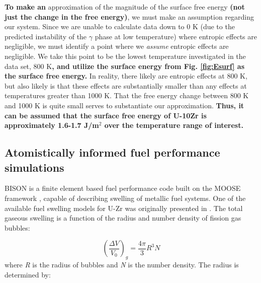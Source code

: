 \documentclass[review]{elsarticle}
\providecommand{\DIFaddtex}[1]{{\bf #1}} %
\providecommand{\DIFdeltex}[1]{} %
\providecommand{\DIFaddbegin}{\protect\color{blue}} %
\providecommand{\DIFaddend}{\protect\color{black}} %
\providecommand{\DIFdelbegin}{\protect\color{red}} %
\providecommand{\DIFdelend}{\protect\color{black}} %
\providecommand{\DIFdelFL}[1]{\DIFdel{#1}} %
\providecommand{\DIFadd}[1]{\texorpdfstring{\DIFaddtex{#1}}{#1}} %
\providecommand{\DIFdel}[1]{\texorpdfstring{\DIFdeltex{#1}}{}} %
\newcommand{\DIFscaledelfig}{0.5}
\newlength{\DIFdelgraphicswidth} %
\newlength{\DIFdelgraphicsheight} %
\newcommand{\DIFaddincludegraphics}[2][]{{\color{blue}\fbox{\DIFOincludegraphics[#1]{#2}}}} %
\newcommand{\DIFdelincludegraphics}[2][]{%
\sbox{\DIFdelgraphicsbox}{\DIFOincludegraphics[#1]{#2}}%
\settoboxwidth{\DIFdelgraphicswidth}{\DIFdelgraphicsbox} %
\settoboxtotalheight{\DIFdelgraphicsheight}{\DIFdelgraphicsbox} %
\scalebox{\DIFscaledelfig}{%
\parbox[b]{\DIFdelgraphicswidth}{\usebox{\DIFdelgraphicsbox}\\[-\baselineskip] \rule{\DIFdelgraphicswidth}{0em}}\llap{\resizebox{\DIFdelgraphicswidth}{\DIFdelgraphicsheight}{%
\setlength{\unitlength}{\DIFdelgraphicswidth}%
\begin{picture}(1,1)%
\thicklines\linethickness{2pt} %
{\color[rgb]{1,0,0}\put(0,0){\framebox(1,1){}}}%
{\color[rgb]{1,0,0}\put(0,0){\line( 1,1){1}}}%
{\color[rgb]{1,0,0}\put(0,1){\line(1,-1){1}}}%
\end{picture}%
}\hspace*{3pt}}} %
} %
\DeclareRobustCommand{\DIFaddbegin}{\DIFOaddbegin \let\includegraphics\DIFaddincludegraphics} %
\DeclareRobustCommand{\DIFaddend}{\DIFOaddend \let\includegraphics\DIFOincludegraphics} %
\DeclareRobustCommand{\DIFdelbegin}{\DIFOdelbegin \let\includegraphics\DIFdelincludegraphics} %
\DeclareRobustCommand{\DIFdelend}{\DIFOaddend \let\includegraphics\DIFOincludegraphics} %
\begin{document}
\DIFadd{To make an }\DIFaddend approximation of the magnitude of the surface free energy \DIFaddbegin \DIFadd{(not just the change in the free energy)}\DIFaddend , we must make an assumption regarding our system. Since we are unable to calculate data down to 0 K (due to the predicted instability of the $\gamma$ phase at low temperature) where entropic effects are negligible, we must identify a point where we \textit{assume} entropic effects are negligible. We take this point to be the lowest temperature investigated in the data set, 800 K\DIFdelbegin \DIFdel{. }\DIFdelend \DIFaddbegin \DIFadd{, and utilize the surface energy from Fig. \ref{fig:Esurf} as the surface free energy. }\DIFaddend In reality, there likely are entropic effects at 800 K, but also likely is that these effects are substantially smaller than any effects at temperatures greater than 1000 K. That the free energy change between 800 K and 1000 K is quite small serves to substantiate our approximation. \DIFaddbegin \DIFadd{Thus, it can be assumed that the surface free energy of U-10Zr is approximately 1.6-1.7 J/m$^2$ over the temperature range of interest. 
}\DIFaddend 

\DIFdelbegin %
{%
\DIFdelFL{The surface free energy as a function of temperature in $\gamma$U-10Zr.}}

\DIFdelend \FloatBarrier

\subsection{Atomistically informed fuel performance simulations}

BISON is a finite element based fuel performance code built on the MOOSE framework \cite{tonks2017}, capable of describing swelling of metallic fuel systems. One of the available fuel swelling models for U-Zr was originally presented in \cite{olander76}. The total gaseous swelling is a function of the radius and number density of fission gas bubbles:

\begin{equation}
  \left(\frac{\Delta V}{V_0}\right)_{g}=\frac{4\pi}{3}R^3 N
  \label{eq:swelling}
\end{equation} where \textit{R} is the radius of bubbles and \textit{N} is the number density. The radius is determined by:
\end{document}
